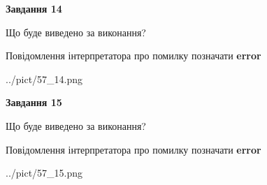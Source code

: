\documentclass[11pt, ukrainian]{article}
\begin{document}
{\begin {large}
{\begin {center}\textbf{Завдання 14}\end {center}}\par
Що буде виведено за виконання? \par
Повідомлення інтерпретатора про помилку позначати \textbf{error}

\begin{center}
	{../pict/57_14.png}
\end{center}
\newpage

{\begin {center}\textbf{Завдання 15}\end {center}}\par
Що буде виведено за виконання? \par
Повідомлення інтерпретатора про помилку позначати \textbf{error}

\begin{center}
	{../pict/57_15.png}
\end{center}
\newpage

\end {large}}
\end{document}

